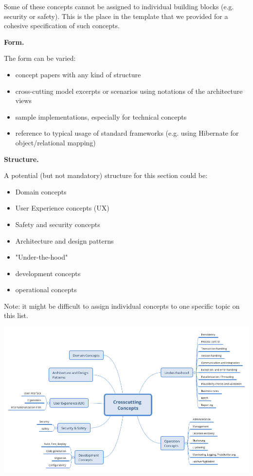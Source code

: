 \documentclass[]{article}
\begin{document}
Some of these concepts cannot be assigned to individual building blocks
(e.g. security or safety). This is the place in the template that we
provided for a cohesive specification of such concepts.

\textbf{Form.}

The form can be varied:

\begin{itemize}
\item
  concept papers with any kind of structure
\item
  cross-cutting model excerpts or scenarios using notations of the
  architecture views
\item
  sample implementations, especially for technical concepts
\item
  reference to typical usage of standard frameworks (e.g. using
  Hibernate for object/relational mapping)
\end{itemize}

\textbf{Structure.}

A potential (but not mandatory) structure for this section could be:

\begin{itemize}
\item
  Domain concepts
\item
  User Experience concepts (UX)
\item
  Safety and security concepts
\item
  Architecture and design patterns
\item
  "Under-the-hood"
\item
  development concepts
\item
  operational concepts
\end{itemize}

Note: it might be difficult to assign individual concepts to one
specific topic on this list.

\includegraphics{images/08-Crosscutting-Concepts-Structure-EN.png}
\end{document}
